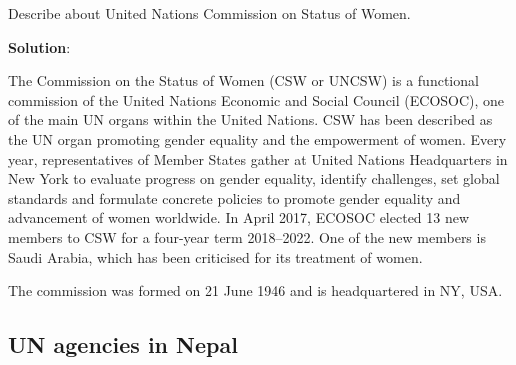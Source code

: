 \documentclass[
  openany]{book}
\newcommand{\question}{\item}
\newenvironment{solution}{ {\bfseries Solution}:}{}
\begin{document}
\begin{questions}

\question Describe about United Nations Commission on Status of Women.

\begin{solution}

The Commission on the Status of Women (CSW or UNCSW) is a functional commission of the United Nations Economic and Social Council (ECOSOC), one of the main UN organs within the United Nations. CSW has been described as the UN organ promoting gender equality and the empowerment of women. Every year, representatives of Member States gather at United Nations Headquarters in New York to evaluate progress on gender equality, identify challenges, set global standards and formulate concrete policies to promote gender equality and advancement of women worldwide. In April 2017, ECOSOC elected 13 new members to CSW for a four-year term 2018–2022. One of the new members is Saudi Arabia, which has been criticised for its treatment of women.

The commission was formed on 21 June 1946 and is headquartered in NY, USA.

\end{solution}

\end{questions}

\hypertarget{un-agencies-in-nepal}{%
\subsection{UN agencies in Nepal}\label{un-agencies-in-nepal}}
\end{document}
